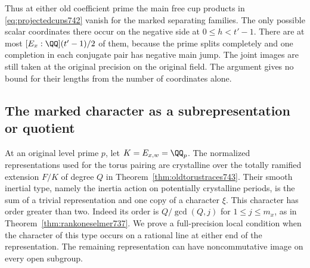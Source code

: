 \documentclass[a4paper,11pt]{article}
\theoremstyle{definition}
\theoremstyle{remark}
\numberwithin{equation}{section}
\begin{document}
Thus at either old coefficient prime the main free cup products
in \eqref{eq:projectedcups742} vanish for the marked separating
families. The only possible scalar coordinates there occur on the
negative side at \(0\le h<t'-1\). There are at most
\([E_x:\QQ](t'-1)/2\) of them, because the prime splits completely
and one completion in each conjugate pair has negative main jump.
The joint images are still taken at the original precision on
the original field. The argument gives no bound for their lengths
from the number of coordinates alone.
\clearpage

\subsection{The marked character as a subrepresentation or quotient}
\label{sec:markedline747}
At an original level prime \(p\), let \(K=E_{x,w}=\QQ_p\).
The normalized representations used for the torus pairing are
crystalline over the totally ramified extension \(F/K\) of degree
\(Q\) in Theorem~\ref{thm:oldtorustraces743}. Their smooth
inertial type, namely the inertia action on potentially crystalline
periods, is the sum of a trivial representation and one copy
of a character \(\xi\). This character has order greater than two.
Indeed its order is \(Q/\gcd(Q,j)\) for \(1\le j\le m_x\), as in
Theorem~\ref{thm:rankoneselmer737}. We prove a full-precision
local condition when the character of this type occurs on a
rational line at either end of the representation. The remaining
representation can have noncommutative image on every open subgroup.
\end{document}
